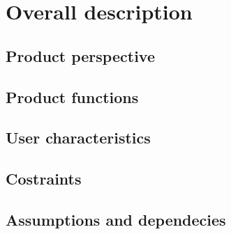 \section{Overall description}
	\subsection{Product perspective}
	\subsection{Product functions}
	\subsection{User characteristics}
	\subsection{Costraints}
	\subsection{Assumptions and dependecies}